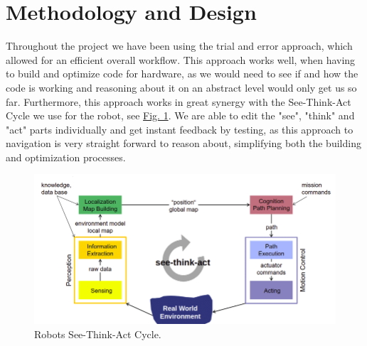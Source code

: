 \documentclass[conference]{IEEEtran}
\begin{document}
\section{Methodology and Design}
Throughout the project we have been using the trial and error approach, which allowed for an efficient overall workflow. 
This approach works well, when having to build and optimize code for hardware, as we would need to see if and how the code is working and reasoning about it on an abstract level would only get us so far.
Furthermore, this approach works in great synergy with the See-Think-Act Cycle we use for the robot, see \href{sec:STAC}{Fig. 1}.
We are able to edit the "see", "think" and "act" parts individually and get instant feedback by testing, as this approach to navigation is very straight forward to reason about, simplifying both the building and optimization processes.
\begin{figure}[htbp]
    \centerline{\includegraphics[width=1.0\columnwidth]{STAC.png}}
    \caption{Robots See-Think-Act Cycle.}
    \label{sec:STAC}
    \end{figure}
\end{document}
